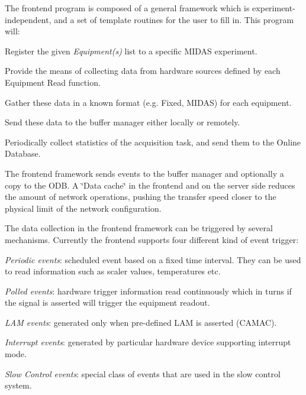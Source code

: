 The frontend program is composed of a general framework which is experiment-\/independent, and a set of template routines for the user to fill in. This program will:
\begin{DoxyItemize}
\item Register the given {\itshape Equipment(s)\/} list to a specific MIDAS experiment.
\item Provide the means of collecting data from hardware sources defined by each Equipment Read function.
\item Gather these data in a known format (e.g. Fixed, MIDAS) for each equipment.
\item Send these data to the buffer manager either locally or remotely.
\item Periodically collect statistics of the acquisition task, and send them to the Online Database.
\end{DoxyItemize}

The frontend framework sends events to the buffer manager and optionally a copy to the ODB. A \char`\"{}Data cache\char`\"{} in the frontend and on the server side reduces the amount of network operations, pushing the transfer speed closer to the physical limit of the network configuration.

The data collection in the frontend framework can be triggered by several mechanisms. Currently the frontend supports four different kind of event trigger:


\begin{DoxyItemize}
\item {\itshape  Periodic events\/}: scheduled event based on a fixed time interval. They can be used to read information such as scaler values, temperatures etc.
\item {\itshape  Polled events\/}: hardware trigger information read continuously which in turns if the signal is asserted will trigger the equipment readout.
\begin{DoxyItemize}
\item {\itshape  LAM events\/}: generated only when pre-\/defined LAM is asserted (CAMAC).
\end{DoxyItemize}
\item {\itshape  Interrupt events\/}: generated by particular hardware device supporting interrupt mode.
\item {\itshape  Slow Control events\/}: special class of events that are used in the slow control system.
\end{DoxyItemize}

